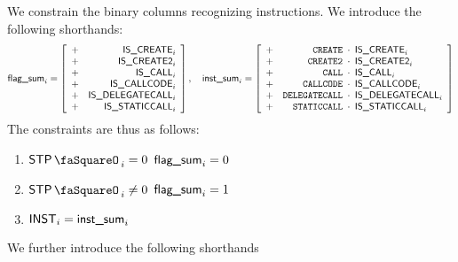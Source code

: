 We constrain the binary columns recognizing instructions. We introduce the following shorthands:
\[
	\flagSum_{i} =
	\left[ \begin{array}{cr}
		+ & \stpCreate_{i}              \\
		+ & \stpCreateTwo_{i}           \\
		+ & \stpCall_{i}                \\
		+ & \stpCallCode_{i}            \\
		+ & \stpDelegateCall_{i}        \\
		+ & \stpStaticCall_{i}          \\
	\end{array} \right]
	,\quad
	\instSum_{i} =
	\left[ \begin{array}{crcl}
		+ & \inst{CREATE}             & \!\!\! \cdot \!\!\! & \stpCreate_{i}           \\
		+ & \inst{CREATE2}            & \!\!\! \cdot \!\!\! & \stpCreateTwo_{i}        \\
		+ & \inst{CALL}               & \!\!\! \cdot \!\!\! & \stpCall_{i}             \\
		+ & \inst{CALLCODE}           & \!\!\! \cdot \!\!\! & \stpCallCode_{i}         \\
		+ & \inst{DELEGATECALL}       & \!\!\! \cdot \!\!\! & \stpDelegateCall_{i}     \\
		+ & \inst{STATICCALL}         & \!\!\! \cdot \!\!\! & \stpStaticCall_{i}       \\
	\end{array} \right]
\]
The constraints are thus as follows:
\begin{enumerate}
	\item \If $\stpStamp_{i} =    0$ \Then $\textsf{flag\_sum}_{i} = 0$
	\item \If $\stpStamp_{i} \neq 0$ \Then $\textsf{flag\_sum}_{i} = 1$
	\item $\textsf{INST}_{i} = \textsf{inst\_sum}_{i}$
\end{enumerate}
We further introduce the following shorthands
